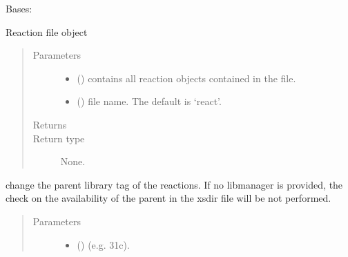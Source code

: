 \documentclass[letterpaper,10pt,english]{sphinxmanual}
\begin{document}
\begin{fulllineitems}
\label{\detokenize{api/inputgeneration:parsersD1S.ReactionFile}}
Bases: 

Reaction file object
\begin{quote}\begin{description}
\item[{Parameters}] \leavevmode\begin{itemize}
\item {} 
 () \textendash{} contains all reaction objects contained in the file.

\item {} 
 (\sphinxstyleliteralemphasis{\sphinxupquote{, }}) \textendash{} file name. The default is ‘react’.

\end{itemize}

\item[{Returns}] \leavevmode


\item[{Return type}] \leavevmode
None.

\end{description}\end{quote}

\begin{fulllineitems}
\label{\detokenize{api/inputgeneration:parsersD1S.ReactionFile.change_lib}}
change the parent library tag of the reactions. If no libmanager is
provided, the check on the availability of the parent in the xsdir
file will be not performed.
\begin{quote}\begin{description}
\item[{Parameters}] \leavevmode\begin{itemize}
\item {} 
 () \textendash{} (e.g. 31c).


\end{itemize}
\end{description}
\end{quote}
\end{fulllineitems}
\end{fulllineitems}
\end{document}

